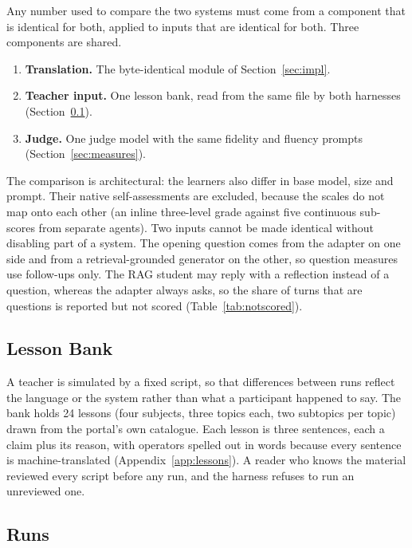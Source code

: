 \documentclass[pdflatex,sn-mathphys-num]{sn-jnl}%
\theoremstyle{thmstyleone}%
\theoremstyle{thmstyletwo}%
\theoremstyle{thmstylethree}%
\begin{document}
Any number used to compare the two systems must come from a component that is identical for both,
applied to inputs that are identical for both. Three components are shared.

\begin{enumerate}
\item \textbf{Translation.} The byte-identical module of Section~\ref{sec:impl}.
\item \textbf{Teacher input.} One lesson bank, read from the same file by both harnesses
(Section~\ref{sec:lessons}).
\item \textbf{Judge.} One judge model with the same fidelity and fluency prompts
(Section~\ref{sec:measures}).
\end{enumerate}

The comparison is architectural: the learners also differ in base model, size and prompt. Their
native self-assessments are excluded, because the scales do not map onto each other (an inline
three-level grade against five continuous sub-scores from separate agents). Two inputs cannot be
made identical without disabling part of a system. The opening question comes from the adapter on one
side and from a retrieval-grounded generator on the other, so question measures use follow-ups only.
The RAG student may reply with a reflection instead of a question, whereas the adapter always asks,
so the share of turns that are questions is reported but not scored (Table~\ref{tab:notscored}).

\subsection{Lesson Bank}\label{sec:lessons}

A teacher is simulated by a fixed script, so that differences between runs reflect the language or
the system rather than what a participant happened to say. The bank holds 24 lessons (four subjects,
three topics each, two subtopics per topic) drawn from the portal's own catalogue. Each lesson is three
sentences, each a claim plus its reason, with operators spelled out in words because every sentence is
machine-translated (Appendix~\ref{app:lessons}). A reader who knows the material reviewed every script
before any run, and the harness refuses to run an unreviewed one.

\subsection{Runs}\label{sec:runs}
\end{document}
